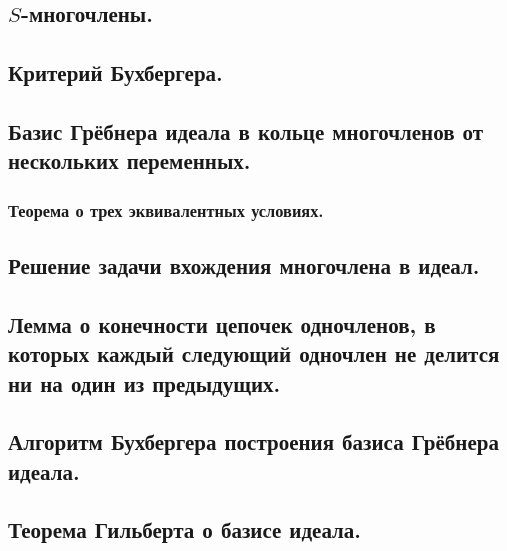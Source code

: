 \mysection
\subsection{\texorpdfstring{$S$}{Lg}-многочлены.}
\subsection{Критерий Бухбергера.}


\newpage
\mysection
\subsection{Базис Грёбнера идеала в кольце многочленов
            от нескольких переменных.}
\subsubsection{Теорема о трех эквивалентных условиях.}
\subsection{Решение задачи вхождения многочлена в идеал.}

\newpage
\mysection
\subsection{Лемма о конечности цепочек одночленов, в которых каждый
            следующий одночлен не делится ни на один из предыдущих.}
\subsection{Алгоритм Бухбергера построения базиса Грёбнера идеала.}

\newpage
\mysection
\subsection{Теорема Гильберта о базисе идеала.}

